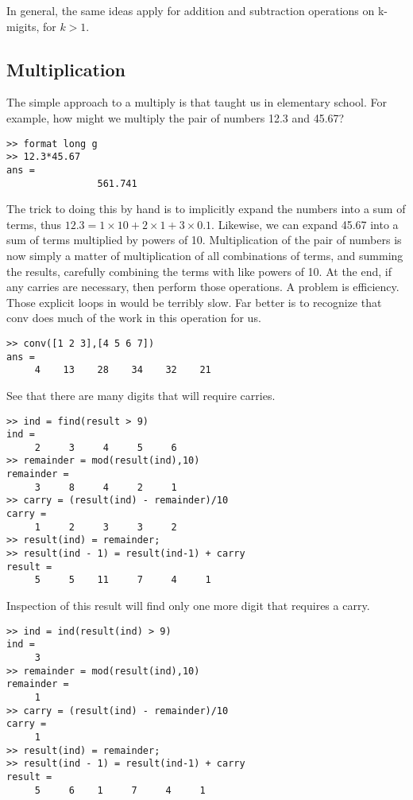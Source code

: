 \documentclass[a4paper,12pt]{article}
\begin{document}
In general, the same ideas apply for addition and subtraction operations on k-migits, for $k > 1$.

\subsection{Multiplication}

The simple approach to a multiply is that taught us in elementary school. For example, how might we multiply the pair of numbers 12.3 and 45.67?

\begin{lstlisting}
>> format long g
>> 12.3*45.67
ans =
                561.741
\end{lstlisting}

The trick to doing this by hand is to implicitly expand the numbers into a sum of terms, thus $12.3 = 1 \times 10 + 2 \times 1 + 3 \times 0.1$. Likewise, we can expand 45.67 into a sum of terms multiplied by powers of 10. Multiplication of the pair of numbers is now simply a matter of multiplication of all combinations of terms, and summing the results, carefully combining the terms with like powers of 10. At the end, if any carries are necessary, then perform those operations. A problem is efficiency. Those explicit loops in \Ml would be terribly slow. Far better is to recognize that conv does much of the work in this operation for us.

\begin{lstlisting}
>> conv([1 2 3],[4 5 6 7])
ans =
     4    13    28    34    32    21
\end{lstlisting}

See that there are many digits that will require carries.

\begin{lstlisting}
>> ind = find(result > 9)
ind =
     2     3     4     5     6
>> remainder = mod(result(ind),10)
remainder =
     3     8     4     2     1
>> carry = (result(ind) - remainder)/10
carry =
     1     2     3     3     2
>> result(ind) = remainder;
>> result(ind - 1) = result(ind-1) + carry
result =
     5     5    11     7     4     1
\end{lstlisting}

Inspection of this result will find only one more digit that requires a carry.

\begin{lstlisting}
>> ind = ind(result(ind) > 9)
ind =
     3
>> remainder = mod(result(ind),10)
remainder =
     1
>> carry = (result(ind) - remainder)/10
carry =
     1
>> result(ind) = remainder;
>> result(ind - 1) = result(ind-1) + carry
result =
     5     6    1     7     4     1
\end{lstlisting}
\end{document}
